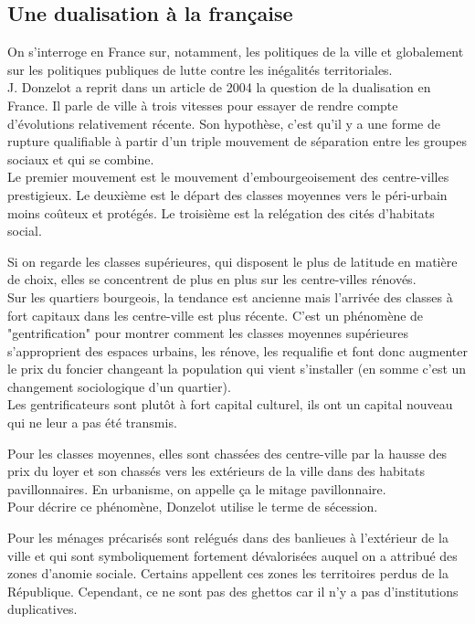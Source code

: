 \documentclass[10pt, a4paper, openany]{book}
\begin{document}
\subsection{Une dualisation à la française}

On s'interroge en France sur, notamment, les politiques de la ville et globalement sur les politiques publiques de lutte contre les inégalités territoriales. \\
J. Donzelot a reprit dans un article de 2004 la question de la dualisation en France. Il parle de ville à trois vitesses pour essayer de rendre compte d'évolutions relativement récente. Son hypothèse, c'est qu'il y a une forme de rupture qualifiable à partir d'un triple mouvement de séparation entre les groupes sociaux et qui se combine. \\
Le premier mouvement est le mouvement d'embourgeoisement des centre-villes prestigieux. Le deuxième est le départ des classes moyennes vers le péri-urbain moins coûteux et protégés. Le troisième est la relégation des cités d'habitats social. 


Si on regarde les classes supérieures, qui disposent le plus de latitude en matière de choix, elles se concentrent de plus en plus sur les centre-villes rénovés. \\
Sur les quartiers bourgeois, la tendance est ancienne mais l'arrivée des classes à fort capitaux dans les centre-ville est plus récente. C'est un phénomène de "gentrification" pour montrer comment les classes moyennes supérieures s'approprient des espaces urbains, les rénove, les requalifie et font donc augmenter le prix du foncier changeant la population qui vient s'installer (en somme c'est un changement sociologique d'un quartier). \\
Les gentrificateurs sont plutôt à fort capital culturel, ils ont un capital nouveau qui ne leur a pas été transmis.


Pour les classes moyennes, elles sont chassées des centre-ville par la hausse des prix du loyer et son chassés vers les extérieurs de la ville dans des habitats pavillonnaires. En urbanisme, on appelle ça le mitage pavillonnaire. \\
Pour décrire ce phénomène, Donzelot utilise le terme de sécession. 


Pour les ménages précarisés sont relégués dans des banlieues à l'extérieur de la ville et qui sont symboliquement fortement dévalorisées auquel on a attribué des zones d'anomie sociale. Certains appellent ces zones les territoires perdus de la République. Cependant, ce ne sont pas des ghettos car il n'y a pas d'institutions duplicatives. 
\end{document}
